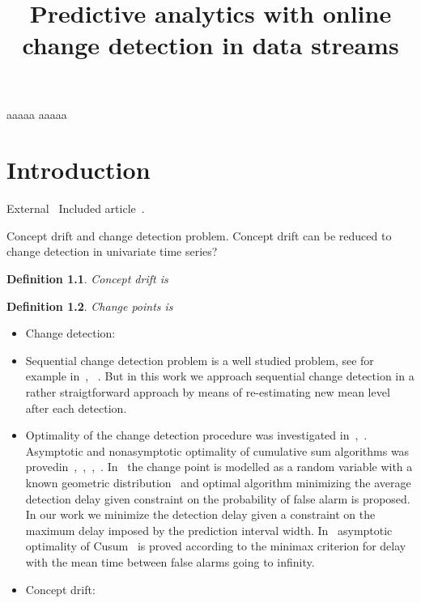 \documentclass[licentiate,utf8,lot,loar,lof,shortloft,index]{jydiss}
\title{Predictive analytics with online change detection in data streams}
\newtheorem{definition}{Definition}
\begin{document}
\preface
{} aaaaa
\acknowledgements
aaaaa
\mainmatter

\chapter{Introduction}
External~\cite{shewhart1931economic}
Included article~\cite{sha1}.

Concept drift and change detection problem.
Concept drift can be reduced to change detection in univariate time series?

\begin{definition}
  Concept drift is
\end{definition}

\begin{definition}
  Change points is
\end{definition}

\begin{itemize}
  \item Change detection:~\cite{basseville1993detection}
  
  \item Sequential change detection problem is a well studied problem, see for example in~\cite{tartakovsky2014sequential}, ~\cite{plasse2021streaming}. But in this work we approach sequential change detection in a rather straigtforward approach by means of re-estimating new mean level after each detection.
  
  \item Optimality of the change detection procedure was investigated in~\cite{Page1954},~\cite{Shiryaev2010,Shiryaev1961,Shiryaev1963}.
  Asymptotic and nonasymptotic optimality of cumulative sum algorithms was provedin~\cite{lorden1971procedures},~\cite{moustakides1986optimal},~\cite{moustakides2004optimality},~\cite{ritov1990decision}. In~\cite{Shiryaev1963,shiryaev2007optimal} the change point is modelled as a random variable with a known geometric distribution~\cite{veeravalli2014quickest} and optimal algorithm minimizing the average detection delay given constraint on the probability of false alarm is proposed. In our work we minimize the detection delay given a constraint on the maximum delay imposed by the prediction interval width. In~\cite{lorden1971procedures} asymptotic optimality of Cusum~\cite{Page1954} is proved according to the minimax criterion for delay with the mean time between false alarms going to infinity.
  
  \item Concept drift:
\end{itemize}
\end{document}

